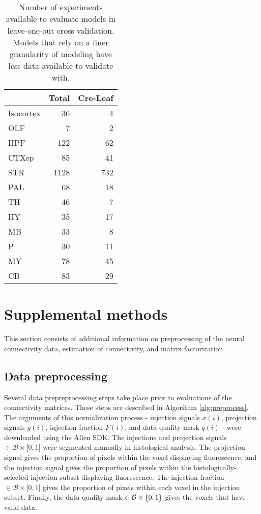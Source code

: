 \begin{table}[H]
\small
\begin{tabular}{lrr}
\toprule
{} &  Total &  Cre-Leaf \\
\midrule
Isocortex &     36 &         4 \\
OLF       &      7 &         2 \\
HPF       &    122 &        62 \\
CTXsp     &     85 &        41 \\
STR       &   1128 &       732 \\
PAL       &     68 &        18 \\
TH        &     46 &         7 \\
HY        &     35 &        17 \\
MB        &     33 &         8 \\
P         &     30 &        11 \\
MY        &     78 &        45 \\
CB        &     83 &        29 \\
\bottomrule
\end{tabular}
\caption{Number of experiments available to evaluate models in leave-one-out cross validation. 
Models that rely on a finer granularity of modeling have less data available to validate with.}  
\end{table}

\newpage 
\section{Supplemental methods}
\label{supp_sec:methods}

This section consists of additional information on preprocessing of the neural connectivity data, estimation of connectivity, and matrix factorization.

\subsection{Data preprocessing}
\label{supp_sec:dp}

Several data prepreprocessing steps take place prior to evaluations of the connectivity matrices.
These steps are described in Algorithm \ref{alg:preprocess}.
The arguments of this normalization process - injection signals $x(i)$, projection signals $y(i)$, injection fraction $F(i)$, and data quality mask $q(i)$ - were downloaded using the Allen SDK. %
The injections and projection signals $\in \mathcal B \times \mathbb [0,1]$ were segmented manually in histological analysis.
The projection signal gives the proportion of pixels within the voxel displaying fluorescence, and the injection signal gives the proportion of pixels within the histologically-selected injection subset displaying fluorescence.
The injection fraction $\in \mathcal B \times \mathbb [0,1]$ gives the proportion of pixels within each voxel in the injection subset.
Finally, the data quality mask $\in \mathcal B \times \mathbb \{0,1\}$ gives the voxels that have valid data.

